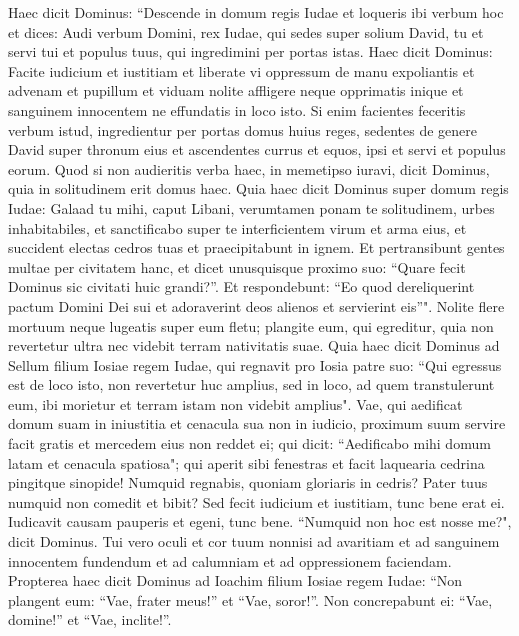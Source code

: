 \begin{biblechapter}  
\verse Haec dicit Dominus: “Descende in domum regis Iudae et loqueris ibi verbum hoc 
\verse et dices: Audi verbum Domini, rex Iudae, qui sedes super solium David, tu et servi tui et populus tuus, qui ingredimini per portas istas. 
\verse Haec dicit Dominus: Facite iudicium et iustitiam et liberate vi oppressum de manu expoliantis et advenam et pupillum et viduam nolite affligere neque opprimatis inique et sanguinem innocentem ne effundatis in loco isto. 
\verse Si enim facientes feceritis verbum istud, ingredientur per portas domus huius reges, sedentes de genere David super thronum eius et ascendentes currus et equos, ipsi et servi et populus eorum. 
\verse Quod si non audieritis verba haec, in memetipso iuravi, dicit Dominus, quia in solitudinem erit domus haec. 
\verse Quia haec dicit Dominus super domum regis Iudae: Galaad tu mihi, caput Libani, verumtamen ponam te solitudinem, urbes inhabitabiles, 
\verse et sanctificabo super te interficientem virum et arma eius, et succident electas cedros tuas et praecipitabunt in ignem. 
\verse Et pertransibunt gentes multae per civitatem hanc, et dicet unusquisque proximo suo: “Quare fecit Dominus sic civitati huic grandi?”. 
\verse Et respondebunt: “Eo quod dereliquerint pactum Domini Dei sui et adoraverint deos alienos et servierint eis”". 
\verse Nolite flere mortuum neque lugeatis super eum fletu; plangite eum, qui egreditur, quia non revertetur ultra nec videbit terram nativitatis suae. 
\verse Quia haec dicit Dominus ad Sellum filium Iosiae regem Iudae, qui regnavit pro Iosia patre suo: “Qui egressus est de loco isto, non revertetur huc amplius, 
\verse sed in loco, ad quem transtulerunt eum, ibi morietur et terram istam non videbit amplius". 
\verse Vae, qui aedificat domum suam in iniustitia et cenacula sua non in iudicio, proximum suum servire facit gratis et mercedem eius non reddet ei; 
\verse qui dicit: “Aedificabo mihi domum latam et cenacula spatiosa"; qui aperit sibi fenestras et facit laquearia cedrina pingitque sinopide! 
\verse Numquid regnabis, quoniam gloriaris in cedris? Pater tuus numquid non comedit et bibit? Sed fecit iudicium et iustitiam, tunc bene erat ei. 
\verse Iudicavit causam pauperis et egeni, tunc bene. “Numquid non hoc est nosse me?", dicit Dominus. 
\verse Tui vero oculi et cor tuum nonnisi ad avaritiam et ad sanguinem innocentem fundendum et ad calumniam et ad oppressionem faciendam. 
\verse Propterea haec dicit Dominus ad Ioachim filium Iosiae regem Iudae: “Non plangent eum: “Vae, frater meus!” et “Vae, soror!”. Non concrepabunt ei: “Vae, domine!” et “Vae, inclite!”. 

\end{biblechapter}

